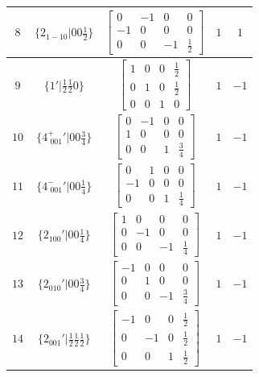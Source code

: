\documentclass[fleqn,8pt]{jsarticle}
\begin{document}
\begin{longtable}{ccccc}
$ 8 $ & $ \{2{}_{1-10}|0 0 \frac{1}{2}\} $ & $ \begin{bmatrix} 0 & -1 & 0 & 0 \\ -1 & 0 & 0 & 0 \\ 0 & 0 & -1 & \frac{1}{2} \end{bmatrix} $ & $ 1 $ & $ 1 $ \\ \hline
$ 9 $ & $ \{1{}'|\frac{1}{2} \frac{1}{2} 0\} $ & $ \begin{bmatrix} 1 & 0 & 0 & \frac{1}{2} \\ 0 & 1 & 0 & \frac{1}{2} \\ 0 & 0 & 1 & 0 \end{bmatrix} $ & $ 1 $ & $ -1 $ \\ \hline
$ 10 $ & $ \{4^{+}_{\,\,001}{}'|0 0 \frac{3}{4}\} $ & $ \begin{bmatrix} 0 & -1 & 0 & 0 \\ 1 & 0 & 0 & 0 \\ 0 & 0 & 1 & \frac{3}{4} \end{bmatrix} $ & $ 1 $ & $ -1 $ \\ \hline
$ 11 $ & $ \{4^{-}_{\,\,001}{}'|0 0 \frac{1}{4}\} $ & $ \begin{bmatrix} 0 & 1 & 0 & 0 \\ -1 & 0 & 0 & 0 \\ 0 & 0 & 1 & \frac{1}{4} \end{bmatrix} $ & $ 1 $ & $ -1 $ \\ \hline
$ 12 $ & $ \{2{}_{100}{}'|0 0 \frac{1}{4}\} $ & $ \begin{bmatrix} 1 & 0 & 0 & 0 \\ 0 & -1 & 0 & 0 \\ 0 & 0 & -1 & \frac{1}{4} \end{bmatrix} $ & $ 1 $ & $ -1 $ \\ \hline
$ 13 $ & $ \{2{}_{010}{}'|0 0 \frac{3}{4}\} $ & $ \begin{bmatrix} -1 & 0 & 0 & 0 \\ 0 & 1 & 0 & 0 \\ 0 & 0 & -1 & \frac{3}{4} \end{bmatrix} $ & $ 1 $ & $ -1 $ \\ \hline
$ 14 $ & $ \{2{}_{001}{}'|\frac{1}{2} \frac{1}{2} \frac{1}{2}\} $ & $ \begin{bmatrix} -1 & 0 & 0 & \frac{1}{2} \\ 0 & -1 & 0 & \frac{1}{2} \\ 0 & 0 & 1 & \frac{1}{2} \end{bmatrix} $ & $ 1 $ & $ -1 $ \\ \hline

\end{longtable}
\end{document}
